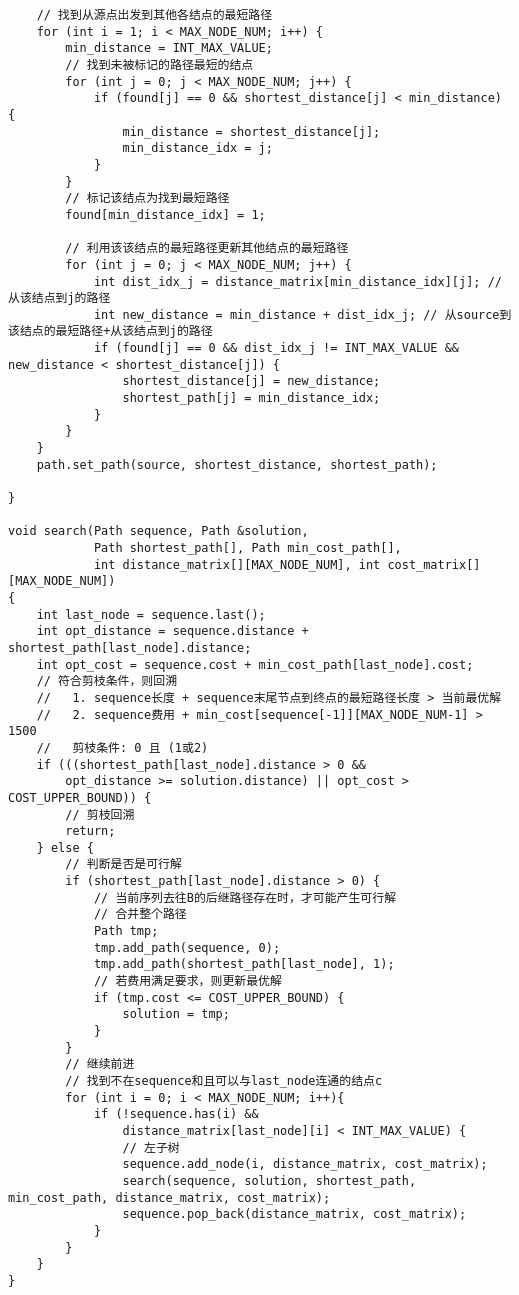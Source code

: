 \documentclass{article}
\begin{document}
\begin{lstlisting}
    // 找到从源点出发到其他各结点的最短路径
    for (int i = 1; i < MAX_NODE_NUM; i++) {
        min_distance = INT_MAX_VALUE;
        // 找到未被标记的路径最短的结点
        for (int j = 0; j < MAX_NODE_NUM; j++) {
            if (found[j] == 0 && shortest_distance[j] < min_distance) {
                min_distance = shortest_distance[j];
                min_distance_idx = j;
            }
        }
        // 标记该结点为找到最短路径
        found[min_distance_idx] = 1;

        // 利用该该结点的最短路径更新其他结点的最短路径
        for (int j = 0; j < MAX_NODE_NUM; j++) {
            int dist_idx_j = distance_matrix[min_distance_idx][j]; // 从该结点到j的路径
            int new_distance = min_distance + dist_idx_j; // 从source到该结点的最短路径+从该结点到j的路径
            if (found[j] == 0 && dist_idx_j != INT_MAX_VALUE && new_distance < shortest_distance[j]) {
                shortest_distance[j] = new_distance;
                shortest_path[j] = min_distance_idx;
            }
        }
    }
    path.set_path(source, shortest_distance, shortest_path);

}

void search(Path sequence, Path &solution,
            Path shortest_path[], Path min_cost_path[],
            int distance_matrix[][MAX_NODE_NUM], int cost_matrix[][MAX_NODE_NUM])
{
    int last_node = sequence.last();
    int opt_distance = sequence.distance + shortest_path[last_node].distance;
    int opt_cost = sequence.cost + min_cost_path[last_node].cost;
    // 符合剪枝条件，则回溯
    //   1. sequence长度 + sequence末尾节点到终点的最短路径长度 > 当前最优解
    //   2. sequence费用 + min_cost[sequence[-1]][MAX_NODE_NUM-1] > 1500
    //   剪枝条件: 0 且 (1或2)
    if (((shortest_path[last_node].distance > 0 &&
        opt_distance >= solution.distance) || opt_cost > COST_UPPER_BOUND)) {
        // 剪枝回溯
        return;
    } else {
        // 判断是否是可行解
        if (shortest_path[last_node].distance > 0) {
            // 当前序列去往B的后继路径存在时，才可能产生可行解
            // 合并整个路径
            Path tmp;
            tmp.add_path(sequence, 0);
            tmp.add_path(shortest_path[last_node], 1);
            // 若费用满足要求，则更新最优解
            if (tmp.cost <= COST_UPPER_BOUND) {
                solution = tmp;
            }
        }
        // 继续前进
        // 找到不在sequence和且可以与last_node连通的结点c
        for (int i = 0; i < MAX_NODE_NUM; i++){
            if (!sequence.has(i) &&
                distance_matrix[last_node][i] < INT_MAX_VALUE) {
                // 左子树
                sequence.add_node(i, distance_matrix, cost_matrix);
                search(sequence, solution, shortest_path, min_cost_path, distance_matrix, cost_matrix);
                sequence.pop_back(distance_matrix, cost_matrix);
            }
        }
    }
}


\end{lstlisting}
\end{document}
